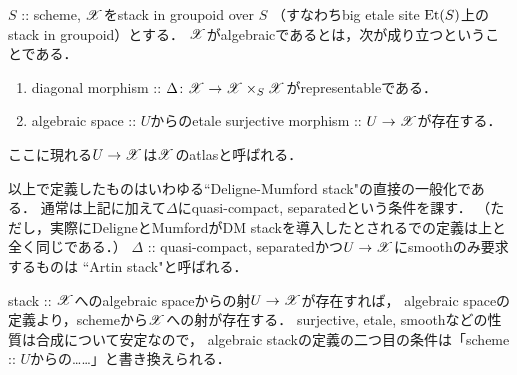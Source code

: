 \documentclass[a4paper, dvipdfmx]{jsarticle}
\newcommand{\Diag}{\Delta}
\begin{document}
\begin{Def}
    $S$ :: scheme, $\mathscr{X}$をstack in groupoid over $S$
    （すなわちbig etale site $\mathrm{Et}(S)$上のstack in groupoid）とする．
    $\mathscr{X}$がalgebraicであるとは，次が成り立つということである．
\begin{enumerate}
    \item diagonal morphism :: $\Diag \colon \fibX \to \fibX \times_{S} \fibX$がrepresentableである．
    \item algebraic space :: $U$からのetale surjective morphism :: $U \to \mathscr{X}$が存在する．
\end{enumerate}
    ここに現れる$U \to \mathscr{X}$は$\mathscr{X}$のatlasと呼ばれる．
\end{Def}

\begin{Remark}
    以上で定義したものはいわゆる``Deligne-Mumford stack"の直接の一般化である．
    通常は上記に加えて$\Diag$にquasi-compact, separatedという条件を課す．
    （ただし，実際にDeligneとMumfordがDM stackを導入したとされる\cite{IrrOfMg}での定義は上と全く同じである．）
    $\Diag$ :: quasi-compact, separatedかつ$U \to \mathscr{X}$にsmoothのみ要求するものは
    ``Artin stack"と呼ばれる．
\end{Remark}

\begin{Remark}
    stack :: $\mathscr{X}$へのalgebraic spaceからの射$U \to \mathscr{X}$が存在すれば，
    algebraic spaceの定義より，schemeから$\mathscr{X}$への射が存在する．
    surjective, etale, smoothなどの性質は合成について安定なので，
    algebraic stackの定義の二つ目の条件は「scheme :: $U$からの……」と書き換えられる．
\end{Remark}
\end{document}
